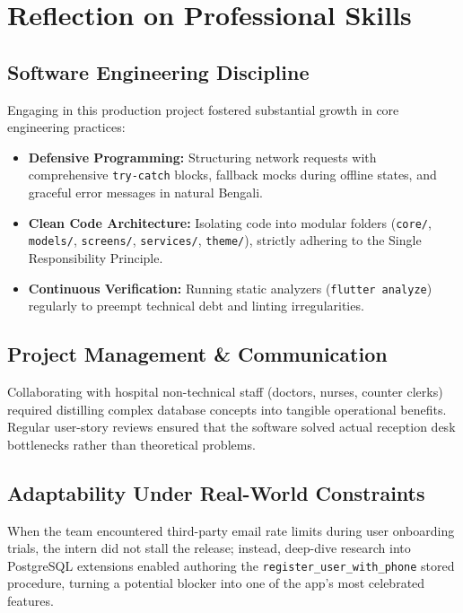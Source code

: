 \documentclass[11pt,a4paper,oneside]{report}
\begin{document}
\chapter{Reflection on Professional Skills}

\section{Software Engineering Discipline}
Engaging in this production project fostered substantial growth in core engineering practices:
\begin{itemize}
    \item \textbf{Defensive Programming:} Structuring network requests with comprehensive \texttt{try-catch} blocks, fallback mocks during offline states, and graceful error messages in natural Bengali.
    \item \textbf{Clean Code Architecture:} Isolating code into modular folders (\texttt{core/}, \texttt{models/}, \texttt{screens/}, \texttt{services/}, \texttt{theme/}), strictly adhering to the Single Responsibility Principle.
    \item \textbf{Continuous Verification:} Running static analyzers (\texttt{flutter analyze}) regularly to preempt technical debt and linting irregularities.
\end{itemize}

\section{Project Management \& Communication}
Collaborating with hospital non-technical staff (doctors, nurses, counter clerks) required distilling complex database concepts into tangible operational benefits. Regular user-story reviews ensured that the software solved actual reception desk bottlenecks rather than theoretical problems.

\section{Adaptability Under Real-World Constraints}
When the team encountered third-party email rate limits during user onboarding trials, the intern did not stall the release; instead, deep-dive research into PostgreSQL extensions enabled authoring the \texttt{register\_user\_with\_phone} stored procedure, turning a potential blocker into one of the app's most celebrated features.
\end{document}
